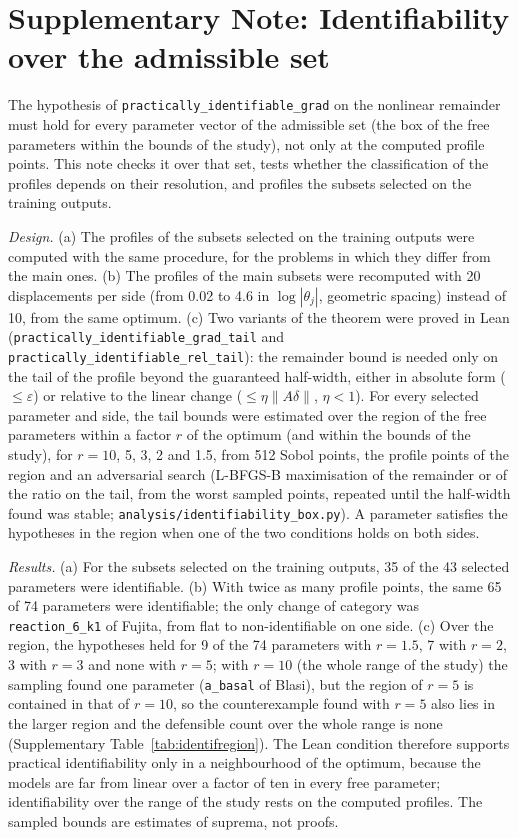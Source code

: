 \section*{Supplementary Note: Identifiability over the admissible set}

The hypothesis of \texttt{practically\_identifiable\_grad} on the nonlinear remainder must hold for every parameter vector of the admissible set (the box of the free parameters within the bounds of the study), not only at the computed profile points. This note checks it over that set, tests whether the classification of the profiles depends on their resolution, and profiles the subsets selected on the training outputs.

\emph{Design.} (a) The profiles of the subsets selected on the training outputs were computed with the same procedure, for the problems in which they differ from the main ones. (b) The profiles of the main subsets were recomputed with 20 displacements per side (from 0.02 to 4.6 in $\log|\theta_j|$, geometric spacing) instead of 10, from the same optimum. (c) Two variants of the theorem were proved in Lean (\texttt{practically\_identifiable\_grad\_tail} and \texttt{practically\_identifiable\_rel\_tail}): the remainder bound is needed only on the tail of the profile beyond the guaranteed half-width, either in absolute form ($\le\varepsilon$) or relative to the linear change ($\le\eta\|A\delta\|$, $\eta<1$). For every selected parameter and side, the tail bounds were estimated over the region of the free parameters within a factor $r$ of the optimum (and within the bounds of the study), for $r=10$, 5, 3, 2 and 1.5, from 512 Sobol points, the profile points of the region and an adversarial search (L-BFGS-B maximisation of the remainder or of the ratio on the tail, from the worst sampled points, repeated until the half-width found was stable; \texttt{analysis/identifiability\_box.py}). A parameter satisfies the hypotheses in the region when one of the two conditions holds on both sides.

\emph{Results.} (a) For the subsets selected on the training outputs, 35 of the 43 selected parameters were identifiable. (b) With twice as many profile points, the same 65 of 74 parameters were identifiable; the only change of category was \texttt{reaction\_6\_k1} of Fujita, from flat to non-identifiable on one side. (c) Over the region, the hypotheses held for 9 of the 74 parameters with $r=1.5$, 7 with $r=2$, 3 with $r=3$ and none with $r=5$; with $r=10$ (the whole range of the study) the sampling found one parameter (\texttt{a\_basal} of Blasi), but the region of $r=5$ is contained in that of $r=10$, so the counterexample found with $r=5$ also lies in the larger region and the defensible count over the whole range is none (Supplementary Table~\ref{tab:identifregion}). The Lean condition therefore supports practical identifiability only in a neighbourhood of the optimum, because the models are far from linear over a factor of ten in every free parameter; identifiability over the range of the study rests on the computed profiles. The sampled bounds are estimates of suprema, not proofs.


